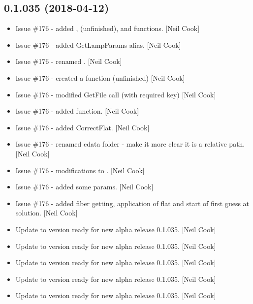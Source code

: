 \documentclass[a4paper,10pt,english]{report}
\begin{document}
\subsection{0.1.035 (2018-04-12)}
\label{\detokenize{misc/changelog:id463}}\begin{itemize}
\item {} 
Issue \#176 - added , 
(unfinished), and  functions. {[}Neil Cook{]}

\item {} 
Issue \#176 - added GetLampParams alias. {[}Neil Cook{]}

\item {} 
Issue \#176 - renamed . {[}Neil Cook{]}

\item {} 
Issue \#176 - created a  function (unfinished) {[}Neil
Cook{]}

\item {} 
Issue \#176 - modified GetFile call (with required key) {[}Neil Cook{]}

\item {} 
Issue \#176 - added  function. {[}Neil Cook{]}

\item {} 
Issue \#176 - added CorrectFlat. {[}Neil Cook{]}

\item {} 
Issue \#176 - renamed cdata folder - make it more clear it is a
relative path. {[}Neil Cook{]}

\item {} 
Issue \#176 - modifications to . {[}Neil Cook{]}

\item {} 
Issue \#176 - added some  params. {[}Neil Cook{]}

\item {} 
Issue \#176 - added fiber getting, application of flat and start of
first guess at solution. {[}Neil Cook{]}

\item {} 
Update to version ready for new alpha release 0.1.035. {[}Neil Cook{]}

\item {} 
Update to version ready for new alpha release 0.1.035. {[}Neil Cook{]}

\item {} 
Update to version ready for new alpha release 0.1.035. {[}Neil Cook{]}

\item {} 
Update to version ready for new alpha release 0.1.035. {[}Neil Cook{]}

\item {} 
Update to version ready for new alpha release 0.1.035. {[}Neil Cook{]}

\end{itemize}
\end{document}
